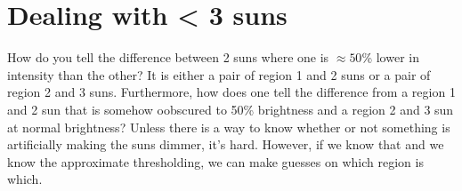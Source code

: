 \documentclass[10pt]{scrartcl}
\begin{document}
\section{Dealing with < 3 suns} %
\label{sec:dealing_with_3_suns}
How do you tell the difference between 2 suns where one is $\approx 50$\% lower in intensity than the other? It is either a pair of region 1 and 2 suns or a pair of region 2 and 3 suns. Furthermore, how does one tell the difference from a region 1 and 2 sun that is somehow oobscured to 50\% brightness and a region 2 and 3 sun at normal brightness? Unless there is a way to know whether or not something is artificially making the suns dimmer, it's hard. However, if we know that and we know the approximate thresholding, we can make guesses on which region is which. 
\end{document}
